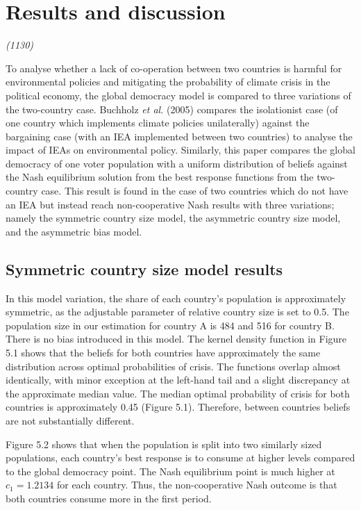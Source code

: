 \documentclass[11pt,preprint, authoryear]{elsarticle}
\numberwithin{equation}{section}
\numberwithin{figure}{section}
\numberwithin{table}{section}
\begin{document}
\hypertarget{results-and-discussion}{%
\section{Results and discussion}\label{results-and-discussion}}

\emph{(1130)}

To analyse whether a lack of co-operation between two countries is
harmful for environmental policies and mitigating the probability of
climate crisis in the political economy, the global democracy model is
compared to three variations of the two-country case. Buchholz \emph{et
al.} (2005) compares the isolationist case (of one country which
implements climate policies unilaterally) against the bargaining case
(with an IEA implemented between two countries) to analyse the impact of
IEAs on environmental policy. Similarly, this paper compares the global
democracy of one voter population with a uniform distribution of beliefs
against the Nash equilibrium solution from the best response functions
from the two-country case. This result is found in the case of two
countries which do not have an IEA but instead reach non-cooperative
Nash results with three variations; namely the symmetric country size
model, the asymmetric country size model, and the asymmetric bias model.

\hypertarget{symmetric-country-size-model-results}{%
\subsection{Symmetric country size model
results}\label{symmetric-country-size-model-results}}

In this model variation, the share of each country's population is
approximately symmetric, as the adjustable parameter of relative country
size is set to 0.5. The population size in our estimation for country A
is 484 and 516 for country B. There is no bias introduced in this model.
The kernel density function in Figure 5.1 shows that the beliefs for
both countries have approximately the same distribution across optimal
probabilities of crisis. The functions overlap almost identically, with
minor exception at the left-hand tail and a slight discrepancy at the
approximate median value. The median optimal probability of crisis for
both countries is approximately 0.45 (Figure 5.1). Therefore, between
countries beliefs are not substantially different.

Figure 5.2 shows that when the population is split into two similarly
sized populations, each country's best response is to consume at higher
levels compared to the global democracy point. The Nash equilibrium
point is much higher at \(c_1=1.2134\) for each country. Thus, the
non-cooperative Nash outcome is that both countries consume more in the
first period.
\end{document}
